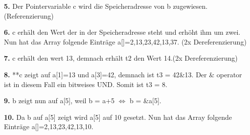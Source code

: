 \documentclass[a4paper,graphics,11pt]{article}
\begin{document}
\textbf{5.} Der Pointervariable c wird die Speicheradresse von b zugewiesen. (Referenzierung)

\textbf{6.} c erhält den Wert der in der Speicheradresse steht und erhöht ihm um zwei. Nun hat das Array folgende Einträge a[]={2,13,23,42,13,37}. (2x Dereferenzierung)

\textbf{7.} c erhält den wert 13, demnach erhält t2 den Wert 14.(2x Dereferenzierung)

\textbf{8.} **c zeigt auf a[1]=13 und a[3]=42, demnach ist t3 = 42\&13. Der \& operator ist in diesem Fall ein bitweises UND. Somit ist t3 = 8.

\textbf{9.} b zeigt nun auf a[5], weil b = a+5 $\Longleftrightarrow$ b = \&a[5].

\textbf{10.} Da b auf a[5] zeigt wird a[5] auf 10 gesetzt. Nun hat das Array folgende Einträge a[]={2,13,23,42,13,10}.
\end{document}

